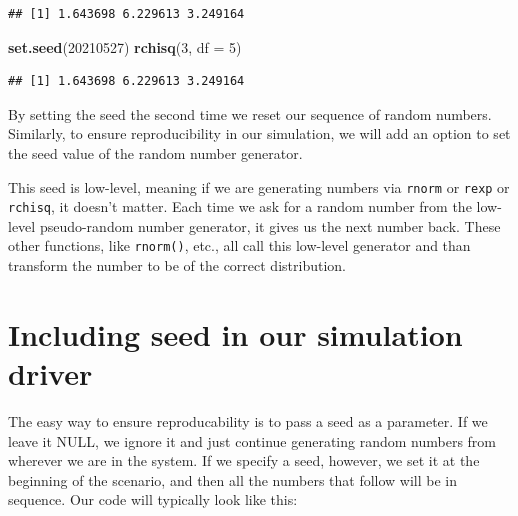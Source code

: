 \documentclass[
]{book}
\newenvironment{Shaded}{\begin{snugshade}}{\end{snugshade}}
\newcommand{\AttributeTok}[1]{\textcolor[rgb]{0.13,0.29,0.53}{#1}}
\newcommand{\DecValTok}[1]{\textcolor[rgb]{0.00,0.00,0.81}{#1}}
\newcommand{\FunctionTok}[1]{\textcolor[rgb]{0.13,0.29,0.53}{\textbf{#1}}}
\newcommand{\NormalTok}[1]{#1}
\begin{document}
\begin{verbatim}
## [1] 1.643698 6.229613 3.249164
\end{verbatim}

\begin{Shaded}
\begin{Highlighting}[]
\FunctionTok{set.seed}\NormalTok{(}\DecValTok{20210527}\NormalTok{)}
\FunctionTok{rchisq}\NormalTok{(}\DecValTok{3}\NormalTok{, }\AttributeTok{df =} \DecValTok{5}\NormalTok{)}
\end{Highlighting}
\end{Shaded}

\begin{verbatim}
## [1] 1.643698 6.229613 3.249164
\end{verbatim}

By setting the seed the second time we reset our sequence of random numbers.
Similarly, to ensure reproducibility in our simulation, we will add an option to set the seed value of the random number generator.

This seed is low-level, meaning if we are generating numbers via \texttt{rnorm} or \texttt{rexp} or \texttt{rchisq}, it doesn't matter.
Each time we ask for a random number from the low-level pseudo-random number generator, it gives us the next number back.
These other functions, like \texttt{rnorm()}, etc., all call this low-level generator and than transform the number to be of the correct distribution.

\section{Including seed in our simulation driver}\label{including-seed-in-our-simulation-driver}

The easy way to ensure reproducability is to pass a seed as a parameter.
If we leave it NULL, we ignore it and just continue generating random numbers from wherever we are in the system.
If we specify a seed, however, we set it at the beginning of the scenario, and then all the numbers that follow will be in sequence.
Our code will typically look like this:
\end{document}
